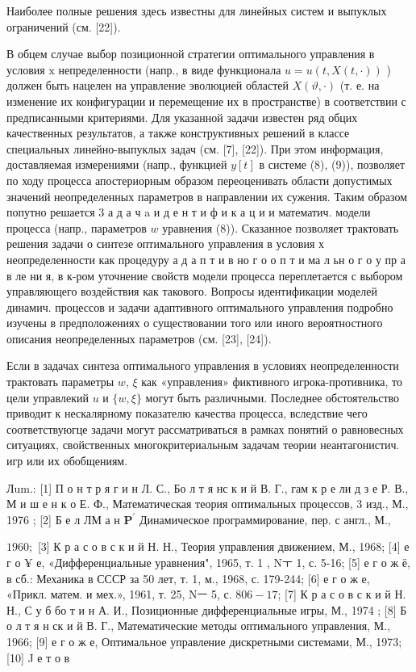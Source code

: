 \documentclass[10pt]{article}
\begin{document}
Наиболее полные решения здесь известны для линейных систем и выпуклых ограничений (см. [22]).



В обцем случае выбор позиционной стратегии оптимального управления в условия $\mathrm{x}$ непределенности (напр., в виде функционала $u=u(t, X(t, \cdot))$ ) должен быть нацелен на управление эволюцией областей $X(\vartheta, \cdot)$ (т. е. на изменение их конфигурации и перемещение их в пространстве) в соответствии с предписанными критериями. Для указанной задачи известен ряд обцих качественных результатов, а также конструктивных решений в классе специальных линейно-выпуклых задач (см. [7], [22]). При этом информация, доставляемая измерениями (напр., функцией $y[t]$ в системе (8), (9)), позволяет по ходу процесса апостериорным образом переоценивать области допустимых значений неопределенных параметров в направлении их сужения. Таким образом попутно решается 3 а д а ч a и д е н т и ф и к а ц и и математич. модели процесса (напр., параметров $w$ уравнения (8)). Сказанное позволяет трактовать решения задачи о синтезе оптимального управления в условия х неопределенности как процедуру а д а п т и в но г о о п т и ма л ьн о г о у пр а в ле ни я, в к-ром уточнение свойств модели процесса переплетается с выбором управляющего воздействия как такового. Вопросы идентификации моделей динамич. процессов и задачи адаптивного оптимального управления подробно изучены в предположениях о существовании того или иного вероятностного описания неопределенных параметров (см. [23], [24]).



Если в задачах синтеза оптимального управления в условиях неопределенности трактовать параметры $w$, $\xi$ как «управления» фиктивного игрока-противника, то цели управлекий $u$ и $\{w, \xi\}$ могут быть различными. Последнее обстоятельство приводит к нескалярному показателю качества процесса, вследствие чего соответствуюгце задачи могут рассматриваться в рамках понятий о равновесных ситуациях, свойственных многокритериальным задачам теории неантагонистич. игр или их обобщениям.



Лum.: [1] П о н т р я г и н Л. С., Бо л т я нс к и й В. Г., гам к р е ли д з е Р. В., М и ш е н к о Е. Ф., Математическая теория оптимальных процессов, 3 изд., М., 1976 ; [2] Б е л ЛМ а н $\mathbf{P}^{\prime}$ Динамическое программирование, пер. с англ., М.,

$1960 ;$ [3] К р а с о в с к и й Н. Н., Теория управления движением, М., 1968; [4] е г о ¥ е, «Дифференциальные уравнения", 1965, т. 1 , Nㅜ 1, с. 5-16; [5] е г о ж ё, в сб.: Механика в СССР за 50 лет, т. 1, м., 1968, с. 179-244; [6] е г о ж е, «Прикл. матем. и мех.», 1961, т. 25, Nㅡ 5, с. $806-17$; [7] К р а с о в с к и й Н. Н., С у б бо т и н А. И., Позиционные дифференциальные игры, М., 1974 ; [8] Б о л т я н ск и й В. Г., Математические методы оптимального управления, М., 1966; [9] е г о ж е, Оптимальное управление дискретными системами, М., 1973; [10] J е т о в
\end{document}
